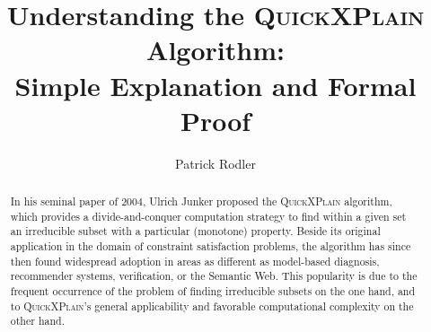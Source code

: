 \documentclass[]{elsarticle}
\begin{document}
	
	\begin{frontmatter}
		
	\title{Understanding the \textsc{QuickXPlain} Algorithm: \\ Simple Explanation and Formal Proof}
		
		
		\author{Patrick Rodler}
		\address{University of Klagenfurt \\ Universit\"atsstrasse 65-67, 9020 Klagenfurt}
		
		
		\begin{abstract}
			In his seminal 
			paper of
			2004, Ulrich Junker proposed the \textsc{QuickXPlain} algorithm, which provides a divide-and-conquer computation strategy to find within a given set an irreducible subset with a particular (monotone) property.
			Beside its original application in the domain of constraint satisfaction problems, the algorithm has since then found widespread adoption in areas as different as model-based diagnosis, recommender systems, verification, or the Semantic Web. This popularity is due to the frequent occurrence of the problem of finding irreducible subsets on the one hand, and to \textsc{QuickXPlain}'s general applicability and favorable computational complexity on the other hand. 
			

\end{abstract}
\end{frontmatter}
\end{document}
